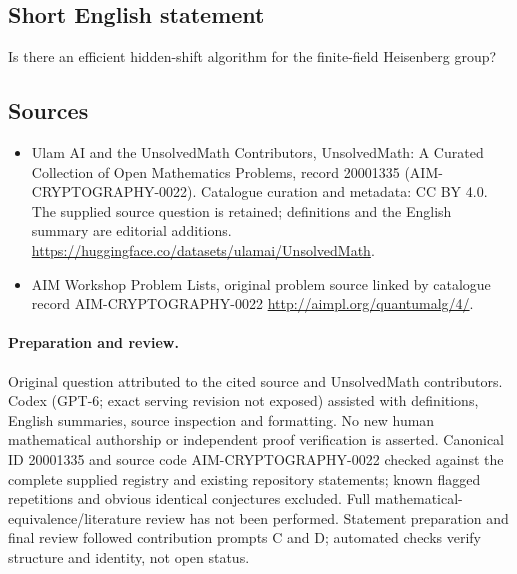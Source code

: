 \documentclass[11pt]{article}
\begin{document}
\subsection{Short English statement}
Is there an efficient hidden-shift algorithm for the finite-field Heisenberg group?
\subsection{Sources}
\begin{itemize}
\item[\hypertarget{source:20001335:1}{S1}] Ulam AI and the UnsolvedMath Contributors, UnsolvedMath: A Curated Collection of Open Mathematics Problems, record 20001335 (AIM-CRYPTOGRAPHY-0022). Catalogue curation and metadata: CC BY 4.0. The supplied source question is retained; definitions and the English summary are editorial additions.
\url{https://huggingface.co/datasets/ulamai/UnsolvedMath}.
\item[\hypertarget{source:20001335:2}{S2}] AIM Workshop Problem Lists, original problem source linked by catalogue record AIM-CRYPTOGRAPHY-0022
\url{http://aimpl.org/quantumalg/4/}.
\end{itemize}
\paragraph{Preparation and review.}
Original question attributed to the cited source and UnsolvedMath contributors. Codex (GPT-6; exact serving revision not exposed) assisted with definitions, English summaries, source inspection and formatting. No new human mathematical authorship or independent proof verification is asserted. Canonical ID 20001335 and source code AIM-CRYPTOGRAPHY-0022 checked against the complete supplied registry and existing repository statements; known flagged repetitions and obvious identical conjectures excluded. Full mathematical-equivalence/literature review has not been performed. Statement preparation and final review followed contribution prompts C and D; automated checks verify structure and identity, not open status.
\label{end:20001335}
\end{document}
